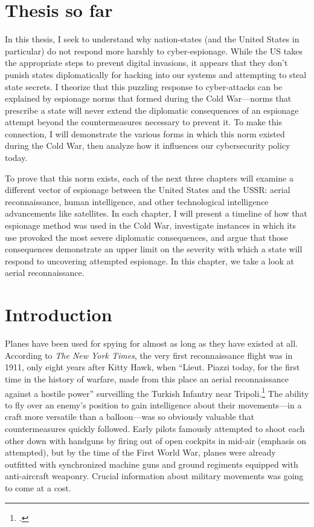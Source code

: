 \documentclass[12pt]{article}
\begin{document}

\section*{Thesis so far}
\begin{em}
In this thesis, I seek to understand why nation-states (and the United States in particular) do not respond more harshly to cyber-espionage. While the US takes the appropriate steps to prevent digital invasions, it appears that they don't punish states diplomatically for hacking into our systems and attempting to steal state secrets. I theorize that this puzzling response to cyber-attacks can be explained by espionage norms that formed during the Cold War---norms that prescribe a state will never extend the diplomatic consequences of an espionage attempt beyond the countermeasures necessary to prevent it. To make this connection, I will demonstrate the various forms in which this norm existed during the Cold War, then analyze how it influences our cybersecurity policy today.

To prove that this norm exists, each of the next three chapters will examine a different vector of espionage between the United States and the USSR: aerial reconnaissance, human intelligence, and other technological intelligence advancements like satellites. In each chapter, I will present a timeline of how that espionage method was used in the Cold War, investigate instances in which its use provoked the most severe diplomatic consequences, and argue that those consequences demonstrate an upper limit on the severity with which a state will respond to uncovering attempted espionage. In this chapter, we take a look at aerial reconnaissance.
\end{em}


\section{Introduction}
Planes have been used for spying for almost as long as they have existed at all. According to \emph{The New York Times}, the very first reconnaissance flight was in 1911, only eight years after Kitty Hawk, when ``Lieut. Piazzi today, for the first time in the history of warfare, made from this place an aerial reconnaissance against a hostile power'' surveilling the Turkish Infantry near Tripoli.\footcite{special_cable_to_the_new_york_times_air_1911} The ability to fly over an enemy's position to gain intelligence about their movements---in a craft more versatile than a balloon---was so obviously valuable that countermeasures quickly followed. Early pilots famously attempted to shoot each other down with handguns by firing out of open cockpits in mid-air (emphasis on attempted), but by the time of the First World War, planes were already outfitted with synchronized machine guns and ground regiments equipped with anti-aircraft weaponry. Crucial information about military movements was going to come at a cost.
\end{document}
